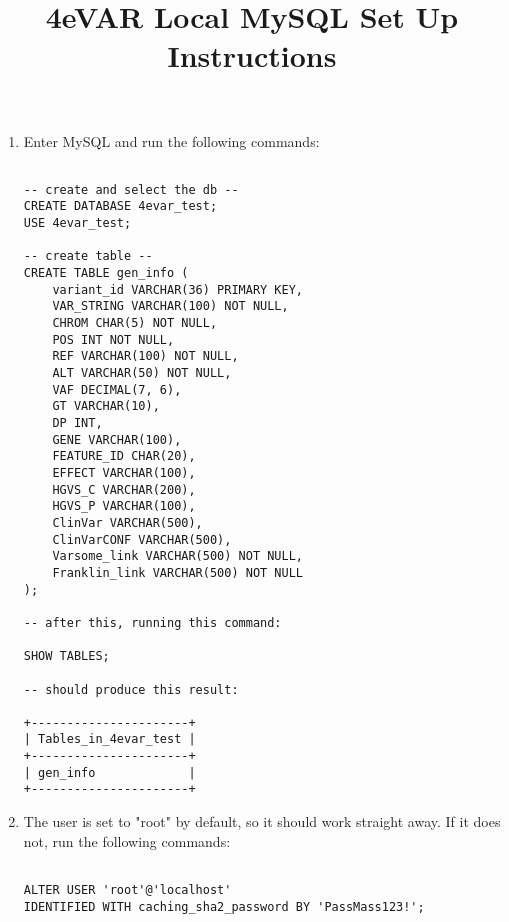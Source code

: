 \documentclass[a4paper,10pt]{article}
\title{4eVAR Local MySQL Set Up Instructions}
\author{}
\date{}
\begin{document}
\maketitle

\begin{enumerate}
 \item Enter MySQL and run the following commands:
 
\begin{verbatim}

-- create and select the db --
CREATE DATABASE 4evar_test;
USE 4evar_test;

-- create table --
CREATE TABLE gen_info (
    variant_id VARCHAR(36) PRIMARY KEY,
    VAR_STRING VARCHAR(100) NOT NULL,
    CHROM CHAR(5) NOT NULL, 
    POS INT NOT NULL,
    REF VARCHAR(100) NOT NULL, 
    ALT VARCHAR(50) NOT NULL,
    VAF DECIMAL(7, 6), 
    GT VARCHAR(10),
    DP INT,
    GENE VARCHAR(100), 
    FEATURE_ID CHAR(20), 
    EFFECT VARCHAR(100), 
    HGVS_C VARCHAR(200), 
    HGVS_P VARCHAR(100), 
    ClinVar VARCHAR(500),
    ClinVarCONF VARCHAR(500),
    Varsome_link VARCHAR(500) NOT NULL, 
    Franklin_link VARCHAR(500) NOT NULL
);

-- after this, running this command:

SHOW TABLES;

-- should produce this result:

+----------------------+
| Tables_in_4evar_test |
+----------------------+
| gen_info             |
+----------------------+

\end{verbatim}


 \item The user is set to "root" by default, so it should work straight away. If it does not, run the following commands:
 
 \begin{verbatim}

ALTER USER 'root'@'localhost'
IDENTIFIED WITH caching_sha2_password BY 'PassMass123!';
  
 \end{verbatim}

 
 
\end{enumerate}
\end{document}

